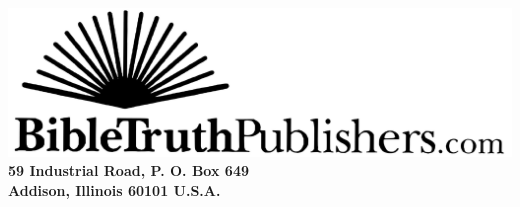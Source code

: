\begin{center}
\href{http://bibletruthpublishers.com/}{\includegraphics[scale=0.06]{booklayout/btp-scan}} \\
\textbf{
\small{59 Industrial Road, P. O. Box 649\\
Addison, Illinois 60101 U.S.A.\\
}
}
\end{center}

